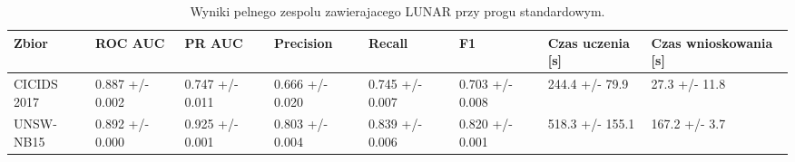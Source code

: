 \begin{table}
\caption{Wyniki pelnego zespolu zawierajacego LUNAR przy progu standardowym.}
\label{tab:ensemble_lunar_results}
\begin{tabular}{llllllll}
\toprule
Zbior & ROC AUC & PR AUC & Precision & Recall & F1 & Czas uczenia [s] & Czas wnioskowania [s] \\
\midrule
CICIDS 2017 & 0.887 +/- 0.002 & 0.747 +/- 0.011 & 0.666 +/- 0.020 & 0.745 +/- 0.007 & 0.703 +/- 0.008 & 244.4 +/- 79.9 & 27.3 +/- 11.8 \\
UNSW-NB15 & 0.892 +/- 0.000 & 0.925 +/- 0.001 & 0.803 +/- 0.004 & 0.839 +/- 0.006 & 0.820 +/- 0.001 & 518.3 +/- 155.1 & 167.2 +/- 3.7 \\
\bottomrule
\end{tabular}
\end{table}
